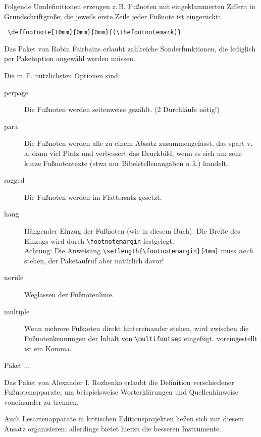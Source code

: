 Folgende Umdefinitionen erzeugen z.\,B. Fußnoten mit eingeklammerten Ziffern 
in Grundschriftgröße; die jeweils erste Zeile jeder Fußnote ist eingerückt:

\begin{lstlisting}
 \deffootnote[10mm]{0mm}{0mm}{(\thefootnotemark)}
\end{lstlisting}



Das Paket  von Robin Fairbains erlaubt zahlreiche Sonderfunktionen, die 
lediglich per Paketoption angewähl werden müssen.

Die m.\,E. nützlichsten Optionen sind:

\begin{description}
 \item[perpage] Die Fußnoten werden seitenweise gezählt. (2 Durchläufe nötig!)
 \item[para] Die Fußnoten werden alle zu einem Absatz zusammengefasst, das spart v.\,a. dann
  viel Platz und verbessert das Druckbild, wenn es sich um sehr kurze Fußnotentexte (etwa nur
  Bibelstellenangaben o.\,ä.) handelt.
 \item[ragged] Die Fußnoten werden im Flattersatz gesetzt.
 \item[hang] Hängender Einzug der Fußnoten (wie in diesem Buch).
  Die Breite des Einzugs wird durch \lstinline/\footnotemargin/ festgelegt.\\
  Achtung: Die Anweisung \lstinline/\setlength{\footnotemargin}{4mm}/ muss \emph{nach}
  \lstinline// stehen, der Paketaufruf aber natürlich davor!
 \item[norule] Weglassen der Fußnotenlinie.
 \item[multiple] Wenn mehrere Fußnoten direkt hintereinander stehen, wird zwischen die
  Fußnotenkennungen der Inhalt von \lstinline/\multifootsep/ eingefügt. voreingestellt ist
  ein Komma.
\end{description}




Paket ...



Das Paket  von Alexander I. Rozhenko
erlaubt die Definition verschiedener Fußnotenapparate, um beispielsweise
Worterklärungen und Quellenhinweise voneinander zu trennen.

Auch Lesartenapparate in kritischen Editionsprojekten ließen sich mit diesem Ansatz
organisieren; allerdings bietet  hierzu die besseren Instrumente.

